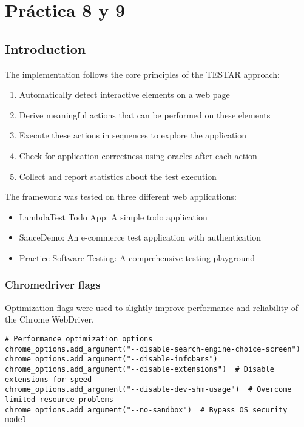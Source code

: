 \chapter{Práctica 8 y 9}

\lstset{language=python}
\lstset{captionpos=t}

\section{Introduction}

The implementation follows the core principles of the TESTAR approach:
\begin{enumerate}
    \item Automatically detect interactive elements on a web page
    \item Derive meaningful actions that can be performed on these elements
    \item Execute these actions in sequences to explore the application
    \item Check for application correctness using oracles after each action
    \item Collect and report statistics about the test execution
\end{enumerate}

The framework was tested on three different web applications:
\begin{itemize}
    \item LambdaTest Todo App: A simple todo application
    \item SauceDemo: An e-commerce test application with authentication
    \item Practice Software Testing: A comprehensive testing playground
\end{itemize}


\subsection{Chromedriver flags}

Optimization flags were used to slightly improve performance and reliability of the Chrome WebDriver.

\begin{lstlisting}[caption=Chrome WebDriver Configuration]
# Performance optimization options
chrome_options.add_argument("--disable-search-engine-choice-screen")
chrome_options.add_argument("--disable-infobars")
chrome_options.add_argument("--disable-extensions")  # Disable extensions for speed
chrome_options.add_argument("--disable-dev-shm-usage")  # Overcome limited resource problems
chrome_options.add_argument("--no-sandbox")  # Bypass OS security model
\end{lstlisting}

